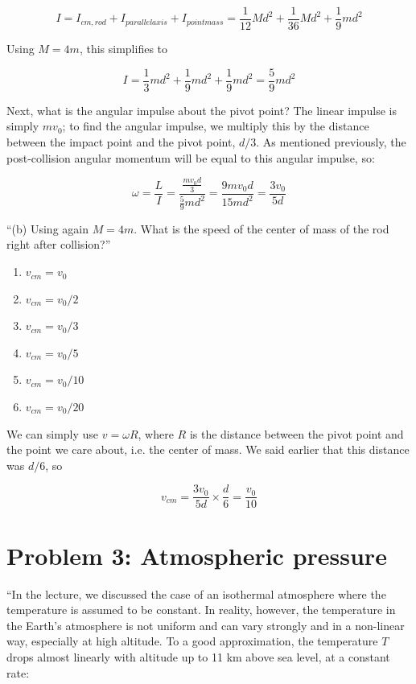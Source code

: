 \documentclass[8.01x]{subfiles}
\begin{document}
\begin{equation}
I = I_{cm,rod} + I_{parallelaxis} + I_{pointmass} = \frac{1}{12} M d^2 + \frac{1}{36} M d^2 + \frac{1}{9} m d^2
\end{equation}

Using $M = 4m$, this simplifies to

\begin{equation}
I = \frac{1}{3} m d^2 + \frac{1}{9} m d^2 + \frac{1}{9} m d^2 = \frac{5}{9} m d^2
\end{equation}

Next, what is the angular impulse about the pivot point? The linear impulse is simply $m v_0$; to find the angular impulse, we multiply this by the distance between the impact point and the pivot point, $d/3$. As mentioned previously, the post-collision angular momentum will be equal to this angular impulse, so:

\begin{equation}
\omega = \frac{L}{I} = \frac{ \frac{m v_0 d}{3} }{\frac{5}{9} m d^2} = \frac{9m v_0 d}{15 m d^2} = \frac{3 v_0}{5 d}
\end{equation}

``(b) Using again $M=4m$. What is the speed of the center of mass of the rod right after collision?''

\begin{enumerate}
\item $v_{cm} = v_0$
\item $v_{cm} = v_0/2$
\item $v_{cm} = v_0/3$
\item $v_{cm} = v_0/5$
\item $v_{cm} = v_0/10$
\item $v_{cm} = v_0/20$
\end{enumerate}

We can simply use $v = \omega R$, where $R$ is the distance between the pivot point and the point we care about, i.e. the center of mass. We said earlier that this distance was $d/6$, so

\begin{equation}
v_{cm} = \frac{3 v_0}{5 d} \times \frac{d}{6} = \frac{v_0}{10}
\end{equation}

\section{Problem 3: Atmospheric pressure}

``In the lecture, we discussed the case of an isothermal atmosphere where the temperature is assumed to be constant. In reality, however, the temperature in the Earth's atmosphere is not uniform and can vary strongly and in a non-linear way, especially at high altitude. To a good approximation, the temperature $T$ drops almost linearly with altitude up to 11 km above sea level, at a constant rate:
\end{document}
